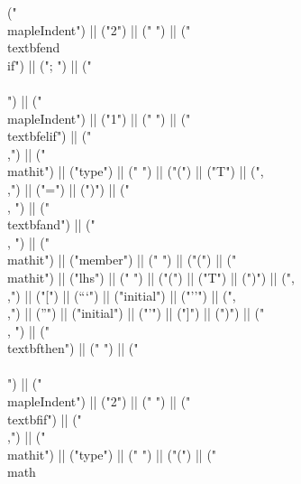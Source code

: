 \documentclass{article}
\begin{document}
\begin{center}
\begin{maplelatex}
{("\\mapleIndent{") || ("2") || ("} ") || ("\\textbf{end\\ if}") || ("; ") || ("\\\\\n") || ("\\mapleIndent{") || ("1") || ("} ") || ("\\textbf{elif}") || (" \\,") || ("\\mathit{") || ("type") || ("} ") || ("(") || ("T") || (",\\,") || ("=") || (")") || (" \\, ") || ("\\textbf{and}") || (" \\, ") || ("\\mathit{") || ("member") || ("} ") || ("(") || ("\\mathit{") || ("lhs") || ("} ") || ("(") || ("T") || (")") || (",\\,") || ("[") || ("``") || ("initial") || ("''") || (",\\,") || ("'") || ("initial") || ("'") || ("]") || (")") || (" \\, ") || ("\\textbf{then}") || (" ") || ("\\\\\n") || ("\\mapleIndent{") || ("2") || ("} ") || ("\\textbf{if}") || (" \\,") || ("\\mathit{") || ("type") || ("} ") || ("(") || ("\\math}
\end{maplelatex}
\end{center}
\end{document}
